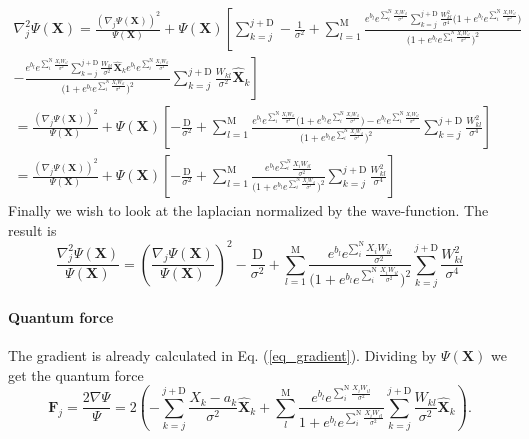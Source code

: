 \begin{align*}	
\nabla^2_j \Psi(\textbf{X}) = \frac{(\nabla_j \Psi(\textbf{X}) )^2}{\Psi(\textbf{X})} + \Psi(\textbf{X})\left[ \sum_{k=j}^{j+\text{D}}-\frac{1}{\sigma^2} + \sum_{l=1}^{\text{M}} \frac{e^{b_l}e^{\sum_{i}^{\text{N}}\frac{X_iW_{il}}{\sigma^2}}\sum_{k=j}^{j+\text{D}} \frac{W_{kl}^2}{\sigma^4}  \Big(1+e^{b_l}e^{\sum_{i}^{\text{N}}\frac{X_iW_{il}}{\sigma^2}}\Big)}{\Big(1+e^{b_l}e^{\sum_{i}^{\text{N}}\frac{X_iW_{il}}{\sigma^2}}\Big)^2} \right.  \\ \left. - \frac{ e^{b_l}e^{\sum_{i}^{\text{N}}\frac{X_iW_{il}}{\sigma^2}}\sum_{k=j}^{j+\text{D}} \frac{W_{kl}}{\sigma^2} \hat{\textbf{X}}_k e^{b_l}e^{\sum_{i}^{\text{N}}\frac{X_iW_{il}}{\sigma^2}} }{\Big(1+e^{b_l}e^{\sum_{i}^{\text{N}}\frac{X_iW_{il}}{\sigma^2}}\Big)^2}   \sum_{k=j}^{j+\text{D}} \frac{W_{kl}}{\sigma^2} \hat{\textbf{X}}_k     \right]  \\
= \frac{(\nabla_j \Psi(\textbf{X}) )^2}{\Psi(\textbf{X})} + \Psi(\textbf{X})\left[-\frac{\text{D}}{\sigma^2} + \sum_{l=1}^{\text{M}}  \frac{e^{b_l}e^{\sum_{i}^{\text{N}}\frac{X_iW_{il}}{\sigma^2}}  \Big(1+e^{b_l}e^{\sum_{i}^{\text{N}}\frac{X_iW_{il}}{\sigma^2}}\Big) - e^{b_l}e^{\sum_{i}^{\text{N}}\frac{X_iW_{il}}{\sigma^2}}}{\Big(1+e^{b_l}e^{\sum_{i}^{\text{N}}\frac{X_iW_{il}}{\sigma^2}}\Big)^2}  \sum_{k=j}^{j+\text{D}} \frac{W^2_{kl}}{\sigma^4}      \right]\\
= \frac{(\nabla_j \Psi(\textbf{X}) )^2}{\Psi(\textbf{X})} + \Psi(\textbf{X})\left[ -\frac{\text{D}}{\sigma^2} + \sum_{l=1}^{\text{M}}   \frac{e^{b_l}e^{\sum_{i}^{\text{N}}}\frac{X_iW_{il}}{\sigma^2}  }{\Big(1+e^{b_l}e^{\sum_{i}^{\text{N}}\frac{X_iW_{il}}{\sigma^2}}\Big)^2}  \sum_{k=j}^{j+\text{D}} \frac{W^2_{kl}}{\sigma^4}      \right]
\end{align*}
Finally we wish to look at the laplacian normalized by the wave-function. The result is 
\begin{equation*}
\frac{\nabla_j^2\Psi(\textbf{X})}{\Psi(\textbf{X})}= \left(\frac{\nabla_j \Psi(\textbf{X}) }{\Psi(\textbf{X})}\right)^2 - \frac{\text{D}}{\sigma^2}  + \sum_{l=1}^{\text{M}}   \frac{e^{b_l}e^{\sum_{i}^{\text{N}}}\frac{X_iW_{il}}{\sigma^2}  }{\Big(1+e^{b_l}e^{\sum_{i}^{\text{N}}\frac{X_iW_{il}}{\sigma^2}}\Big)^2}  \sum_{k=j}^{j+\text{D}} \frac{W^2_{kl}}{\sigma^4}     
\label{eq_laplace}
\end{equation*}


\paragraph{Quantum force}
The gradient is already calculated in Eq. (\ref{eq_gradient}). Dividing by $\Psi(\textbf{X})$ we get the quantum force 
\begin{equation*}
\textbf{F}_j = \frac{2\nabla\Psi}{\Psi}=  2\left(  -\sum_{k=j}^{j+\text{D}} \frac{X_k-a_k}{\sigma^2} \hat{\textbf{X}}_k  + \sum_{l}^{\text{M}}\frac{e^{b_l}e^{\sum_{i}^{\text{N}}\frac{X_iW_{il}}{\sigma^2}}}{1+e^{b_l}e^{\sum_{i}^{\text{N}}\frac{X_iW_{il}}{\sigma^2}}}  \sum_{k=j}^{j+\text{D}} \frac{W_{kl}}{\sigma^2} \hat{\textbf{X}}_k    \right).
\label{eq_quantumforce}
\end{equation*}

